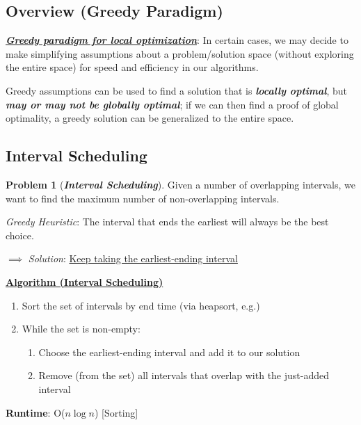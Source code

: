 \documentclass[12pt]{extarticle}
\theoremstyle{definition}
\newtheorem*{problem}{Problem}
\theoremstyle{remark}
\newcommand{\probname}[1]{\noindent \textbf{\textit{#1}}}
\newcommand{\probtitle}[1]{\noindent \textbf{\ul{#1}}}
\begin{document}
\subsection*{Overview (Greedy Paradigm)}
\textbf{\textit{\ul{Greedy paradigm for local optimization}}}: In certain cases, we may decide to make simplifying assumptions about a problem/solution space (without exploring the entire space) for speed and efficiency in our algorithms.

\vspace{5pt}
Greedy assumptions can be used to find a solution that is \textbf{\textit{locally optimal}}, but \textbf{\textit{may or may not be globally optimal}}; if we can then find a proof of global optimality, a greedy solution can be generalized to the entire space.

\subsection{Interval Scheduling}
\begin{problem}[\probname{Interval Scheduling}]
    Given a number of overlapping intervals, we want to find the maximum number of non-overlapping intervals.
\end{problem}

\vspace{5pt}
\begin{center}
\end{center}

\vspace{5pt}
\noindent \textit{Greedy Heuristic}: The interval that ends the earliest will always be the best choice.

\vspace{8pt}
\noindent$\implies$ \textit{Solution}: \ul{Keep taking the earliest-ending interval}

\vspace{8pt}
\begin{tcolorbox}[colback=yellow!8!white]
    \noindent\probtitle{Algorithm (Interval Scheduling)}
    \begin{enumerate}
        \item Sort the set of intervals by end time (via heapsort, e.g.)
        \item While the set is non-empty: \begin{enumerate}
            \item Choose the earliest-ending interval and add it to our solution
            \item Remove (from the set) all intervals that overlap with the just-added interval
        \end{enumerate}
    \end{enumerate}

    \textbf{Runtime}: O($n\log n$) [Sorting]
\end{tcolorbox}
\end{document}
